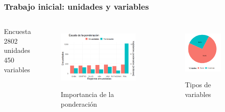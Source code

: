 \documentclass[10pt]{beamer}
\begin{document}
\begin{frame}
  \frametitle{Trabajo inicial: unidades y variables}
  \begin{columns}
      Encuesta\\
      2802 unidades\\
      450 variables
      \begin{figure}
        \includegraphics[width=\textwidth]{pondera}
        \label{fig:pondera}
        \caption{Importancia de la ponderación}
      \end{figure}
      \begin{figure}
        \includegraphics[width=0.8\textwidth]{tipos_variables}
        \label{fig:tipos_variables}
        \caption{Tipos de variables}
      \end{figure}
  \end{columns}


\end{frame}
\end{document}
